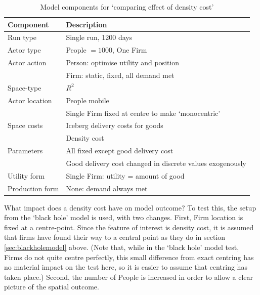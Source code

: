 %
\renewcommand{\arraystretch}{1.2}
\begin{table}[!hbt]
\begin{center}

\begin{tabular}{|l|l|}
\hline 
\textbf{Component} & \textbf{Description}\\
\hline
Run type & Single run, 1200 days  \\
\hline
Actor type & People $ = 1000$, One Firm \\
\hline
Actor action & Person: optimise utility and position\\
& Firm: static, fixed, all demand met\\
\hline
Space-type & $R^2$\\
\hline
Actor location & People mobile\\
& Single Firm fixed at centre to make `monocentric’\\ 
\hline
Space costs & Iceberg delivery costs for goods \\
& Density cost\\
\hline
Parameters & All fixed except good delivery cost\\
& Good delivery cost changed in discrete values exogenously\\
\hline
Utility form & Single Firm: utility = amount of good\\
\hline
Production form & None: demand always met\\
\hline

\end{tabular}

\caption{Model components for `comparing effect of density cost’ \label{tab:cfdensity}}
\end{center}
\end{table}

What impact does a density cost have on model outcome? To test this, the setup from the `black hole' model is used, with two changes. First, Firm location is fixed at a centre-point. Since the feature of interest is density cost, it is assumed that firms have found their way to a central point as they do in section \ref{sec:blackholemodel} above. (Note that, while in the `black hole' model test, Firms do not quite centre perfectly, this small difference from exact centring has no material impact on the test here, so it is easier to assume that centring has taken place.) Second, the number of People is increased in order to allow a clear picture of the spatial outcome.

